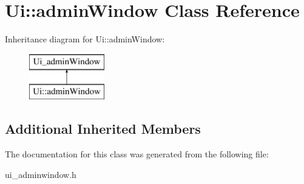 \hypertarget{class_ui_1_1admin_window}{}\section{Ui\+:\+:admin\+Window Class Reference}
\label{class_ui_1_1admin_window}
Inheritance diagram for Ui\+:\+:admin\+Window\+:\begin{figure}[H]
\begin{center}
\leavevmode
\includegraphics[height=2.000000cm]{class_ui_1_1admin_window}
\end{center}
\end{figure}
\subsection*{Additional Inherited Members}


The documentation for this class was generated from the following file\+:\begin{DoxyCompactItemize}
\item 
ui\+\_\+adminwindow.\+h\end{DoxyCompactItemize}

